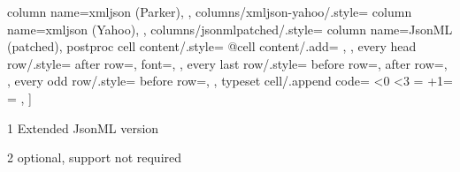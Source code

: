 \begin{threeparttable}
{        column name=xmljson (Parker),
    },
    columns/xmljson-yahoo/.style={
        column name=xmljson (Yahoo),
    },
    columns/jsonmlpatched/.style={
        column name={JsonML (patched)},
        postproc cell content/.style={%
            @cell content/.add={
               }{}
        },
    },
    every head row/.style={
        after row=\toprule,
        font=\selectfont,
    },
    every last row/.style={
        before row=\midrule,
        after row=\bottomrule,
    },
    every odd row/.style={
        before row={},
    },
    typeset cell/.append code={%
        \ifnum\pgfplotstablerow<0%
            \ifnum\pgfplotstablecol<3
            \else
                \ifnum\pgfplotstablecol=\pgfplotstablecols
                \else
                \fi
            \fi
        \fi
        \ifnum\numexpr\pgfplotstablerow+1=\pgfplotstablerows
            \ifnum\pgfplotstablecol=\pgfplotstablecols
            \else
            \fi
        \fi
    },
]\loadedtable
    \begin{tablenotes}
        \item[1] Extended JsonML version
        \ifx\hasfootnote\undefined
        \else
    \item[2] optional, support not required
        \fi
    \end{tablenotes}
  \end{threeparttable}\hspace{3em}~


